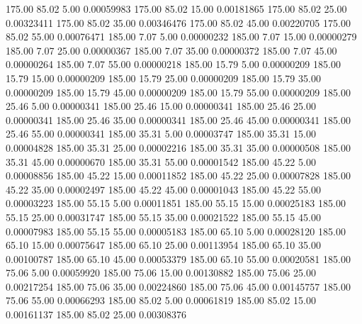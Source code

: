     175.00     85.02      5.00     0.00059983
    175.00     85.02     15.00     0.00181865
    175.00     85.02     25.00     0.00323411
    175.00     85.02     35.00     0.00346476
    175.00     85.02     45.00     0.00220705
    175.00     85.02     55.00     0.00076471
    185.00      7.07      5.00     0.00000232
    185.00      7.07     15.00     0.00000279
    185.00      7.07     25.00     0.00000367
    185.00      7.07     35.00     0.00000372
    185.00      7.07     45.00     0.00000264
    185.00      7.07     55.00     0.00000218
    185.00     15.79      5.00     0.00000209
    185.00     15.79     15.00     0.00000209
    185.00     15.79     25.00     0.00000209
    185.00     15.79     35.00     0.00000209
    185.00     15.79     45.00     0.00000209
    185.00     15.79     55.00     0.00000209
    185.00     25.46      5.00     0.00000341
    185.00     25.46     15.00     0.00000341
    185.00     25.46     25.00     0.00000341
    185.00     25.46     35.00     0.00000341
    185.00     25.46     45.00     0.00000341
    185.00     25.46     55.00     0.00000341
    185.00     35.31      5.00     0.00003747
    185.00     35.31     15.00     0.00004828
    185.00     35.31     25.00     0.00002216
    185.00     35.31     35.00     0.00000508
    185.00     35.31     45.00     0.00000670
    185.00     35.31     55.00     0.00001542
    185.00     45.22      5.00     0.00008856
    185.00     45.22     15.00     0.00011852
    185.00     45.22     25.00     0.00007828
    185.00     45.22     35.00     0.00002497
    185.00     45.22     45.00     0.00001043
    185.00     45.22     55.00     0.00003223
    185.00     55.15      5.00     0.00011851
    185.00     55.15     15.00     0.00025183
    185.00     55.15     25.00     0.00031747
    185.00     55.15     35.00     0.00021522
    185.00     55.15     45.00     0.00007983
    185.00     55.15     55.00     0.00005183
    185.00     65.10      5.00     0.00028120
    185.00     65.10     15.00     0.00075647
    185.00     65.10     25.00     0.00113954
    185.00     65.10     35.00     0.00100787
    185.00     65.10     45.00     0.00053379
    185.00     65.10     55.00     0.00020581
    185.00     75.06      5.00     0.00059920
    185.00     75.06     15.00     0.00130882
    185.00     75.06     25.00     0.00217254
    185.00     75.06     35.00     0.00224860
    185.00     75.06     45.00     0.00145757
    185.00     75.06     55.00     0.00066293
    185.00     85.02      5.00     0.00061819
    185.00     85.02     15.00     0.00161137
    185.00     85.02     25.00     0.00308376
